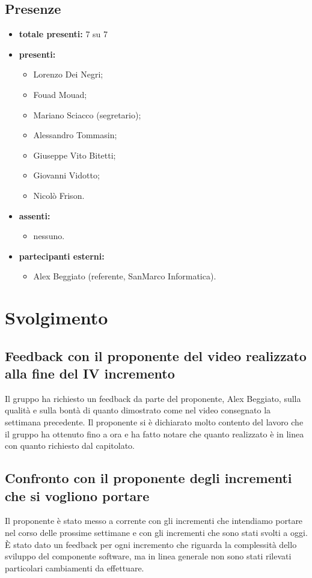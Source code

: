 \subsection*{Presenze}
	\begin{itemize}
		\item \textbf{totale presenti:} 7 su 7
		\item \textbf{presenti: }
			\begin{itemize}
				\item Lorenzo Dei Negri;
				\item Fouad Mouad;
				\item Mariano Sciacco (segretario);
				\item Alessandro Tommasin;
				\item Giuseppe Vito Bitetti;
				\item Giovanni Vidotto;
				\item Nicolò Frison.
			\end{itemize}
		\item \textbf{assenti: }
			\begin{itemize}
				\item nessuno.
			\end{itemize}
		\item  \textbf{partecipanti esterni:}
			\begin{itemize}
				\item Alex Beggiato (referente, SanMarco Informatica).
			\end{itemize}
	\end{itemize}


\newpage
\section*{Svolgimento}

	\subsection*{Feedback con il proponente del video realizzato alla fine del IV incremento}
		Il gruppo ha richiesto un feedback da parte del proponente, Alex Beggiato, sulla qualità e sulla bontà di quanto dimostrato come  nel video consegnato la settimana precedente. Il proponente si è dichiarato molto contento del lavoro che il gruppo ha ottenuto fino a ora e ha fatto notare che quanto realizzato è in linea con quanto richiesto dal capitolato.

	\subsection*{Confronto con il proponente degli incrementi che si vogliono portare}
		Il proponente è stato messo a corrente con gli incrementi che intendiamo portare nel corso delle prossime settimane e con gli incrementi che sono stati svolti a oggi. È stato dato un feedback per ogni incremento che riguarda la complessità dello sviluppo del componente software, ma in linea generale non sono stati rilevati particolari cambiamenti da effettuare.

